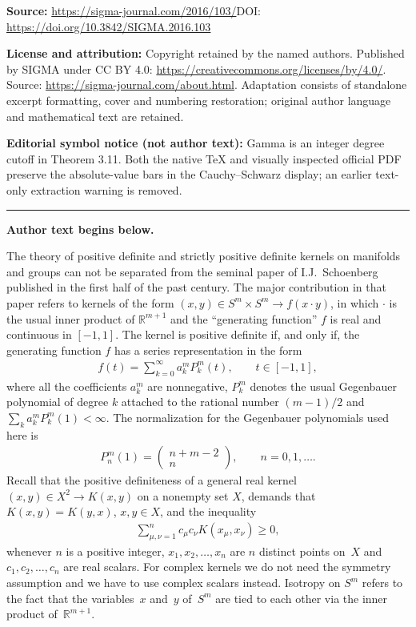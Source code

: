 \documentclass[11pt]{article}
\numberwithin{equation}{section}
\begin{document}
\noindent\textbf{Source:} \url{https://sigma-journal.com/2016/103/}\quad DOI: \url{https://doi.org/10.3842/SIGMA.2016.103}\par
\noindent\textbf{License and attribution:} Copyright retained by the named authors. Published by SIGMA under CC BY 4.0: \url{https://creativecommons.org/licenses/by/4.0/}. Source: \url{https://sigma-journal.com/about.html}. Adaptation consists of standalone excerpt formatting, cover and numbering restoration; original author language and mathematical text are retained.\par
\noindent\textbf{Editorial symbol notice (not author text):} Gamma is an integer degree cutoff in Theorem 3.11. Both the native TeX and visually inspected official PDF preserve the absolute-value bars in the Cauchy–Schwarz display; an earlier text-only extraction warning is removed.\par
\medskip\hrule\medskip\noindent\textbf{Author text begins below.}\par
\setcounter{section}{1}
\setcounter{subsection}{0}
\setcounter{subsubsection}{0}
\setcounter{Theorem}{0}
\setcounter{equation}{0}
The theory of positive def\/inite and strictly positive def\/inite kernels on manifolds and groups can not be separated from the seminal paper of I.J.~Schoenberg~\cite{schoen} published in the f\/irst half of the past century. The major contribution in that paper refers to kernels of the form $(x,y) \in S^m \times S^m \to f(x \cdot y)$, in which $\cdot$ is the usual inner product of $\mathbb{R}^{m+1}$ and the ``generating function'' $f$ is real and continuous in $[-1,1]$. The kernel is positive def\/inite if, and only if, the generating function $f$ has a series representation in the form
\begin{gather*}
f(t)=\sum_{k=0}^{\infty}a_{k}^mP_{k}^m(t),\qquad t \in [-1,1],
\end{gather*}
where all the coef\/f\/icients $a_k^m$ are nonnegative, $P_k^m$ denotes the usual Gegenbauer polynomial of degree $k$ attached to the rational number $(m-1)/2$ and $\sum_{k}a_k^m P_k^m(1)<\infty$. The normalization for the Gegenbauer polynomials used here is
\begin{gather*}
P_n^m(1)=\left(\begin{matrix} n+m-2 \\ n \end{matrix} \right),\qquad n=0,1,\ldots.
\end{gather*}
Recall that the positive def\/initeness of a general real kernel $(x,y) \in X^2 \to K(x,y)$ on a nonempty set $X$, demands that $K(x,y)=K(y,x)$, $x,y\in X$, and the inequality
\begin{gather*} \sum_{\mu,\nu=1}^nc_\mu c_\nu K(x_\mu , x_\nu)\geq 0,
\end{gather*}
whenever $n$ is a positive integer, $x_1, x_2, \ldots, x_n$ are $n$ distinct points on~$X$ and $c_1, c_2, \ldots, c_n$ are real scalars. For complex kernels we do not need the symmetry assumption and we have to use complex scalars instead. Isotropy on $S^m$ refers to the fact that the variables~$x$ and~$y$ of~$S^m$ are tied to each other via the inner product of~$\mathbb{R}^{m+1}$.
\end{document}
